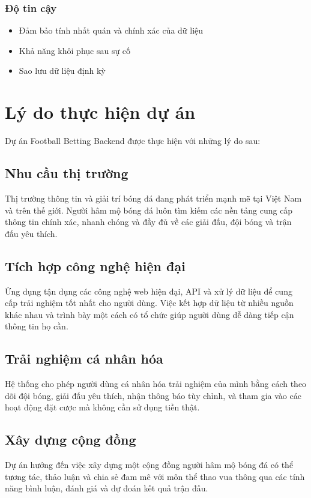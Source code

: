 \documentclass[a4paper,12pt]{report}
\begin{document}
\subsubsection{Độ tin cậy}
\begin{itemize}
    \item Đảm bảo tính nhất quán và chính xác của dữ liệu
    \item Khả năng khôi phục sau sự cố
    \item Sao lưu dữ liệu định kỳ
\end{itemize}

\section{Lý do thực hiện dự án}

Dự án Football Betting Backend được thực hiện với những lý do sau:

\subsection{Nhu cầu thị trường}
Thị trường thông tin và giải trí bóng đá đang phát triển mạnh mẽ tại Việt Nam và trên thế giới. Người hâm mộ bóng đá luôn tìm kiếm các nền tảng cung cấp thông tin chính xác, nhanh chóng và đầy đủ về các giải đấu, đội bóng và trận đấu yêu thích.

\subsection{Tích hợp công nghệ hiện đại}
Ứng dụng tận dụng các công nghệ web hiện đại, API và xử lý dữ liệu để cung cấp trải nghiệm tốt nhất cho người dùng. Việc kết hợp dữ liệu từ nhiều nguồn khác nhau và trình bày một cách có tổ chức giúp người dùng dễ dàng tiếp cận thông tin họ cần.

\subsection{Trải nghiệm cá nhân hóa}
Hệ thống cho phép người dùng cá nhân hóa trải nghiệm của mình bằng cách theo dõi đội bóng, giải đấu yêu thích, nhận thông báo tùy chỉnh, và tham gia vào các hoạt động đặt cược mà không cần sử dụng tiền thật.

\subsection{Xây dựng cộng đồng}
Dự án hướng đến việc xây dựng một cộng đồng người hâm mộ bóng đá có thể tương tác, thảo luận và chia sẻ đam mê với môn thể thao vua thông qua các tính năng bình luận, đánh giá và dự đoán kết quả trận đấu.
\end{document}
